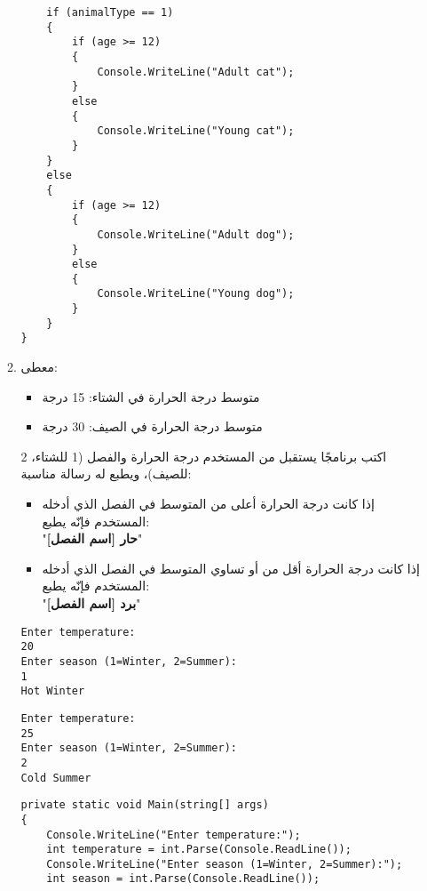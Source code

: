 \documentclass[12pt, twoside]{article}
\begin{document}
\begin{enumerate}[itemsep=3em]
\begin{enumerate}
\begin{boxSolution}
\begin{english}
\begin{verbatim}
    if (animalType == 1)
    {
        if (age >= 12)
        {
            Console.WriteLine("Adult cat");
        }
        else
        {
            Console.WriteLine("Young cat");
        }
    }
    else
    {
        if (age >= 12)
        {
            Console.WriteLine("Adult dog");
        }
        else
        {
            Console.WriteLine("Young dog");
        }
    }
}
\end{verbatim}
\end{english}
\end{boxSolution}
\fi
\clearpage
\fi

\item
معطى:
\begin{itemize}
\item متوسط درجة الحرارة في الشتاء: 15 درجة
\item متوسط درجة الحرارة في الصيف: 30 درجة
\end{itemize}%
اكتب برنامجًا يستقبل من المستخدم درجة الحرارة والفصل (1 للشتاء، 2 للصيف)، ويطبع له رسالة مناسبة:
\begin{itemize}
\item إذا كانت درجة الحرارة أعلى من المتوسط في الفصل الذي أدخله المستخدم فإنّه يطبع: \\ "\textbf{حار [اسم الفصل]}"
\item إذا كانت درجة الحرارة أقل من أو تساوي المتوسط في الفصل الذي أدخله المستخدم فإنّه يطبع: \\ "\textbf{برد [اسم الفصل]}"
\end{itemize}%
\ifdetailed
\begin{boxExample}[1]
\begin{english}
\begin{verbatim}
Enter temperature:
20
Enter season (1=Winter, 2=Summer):
1
Hot Winter
\end{verbatim}
\end{english}
\end{boxExample}
\begin{boxExample}[2]
\begin{english}
\begin{verbatim}
Enter temperature:
25
Enter season (1=Winter, 2=Summer):
2
Cold Summer
\end{verbatim}
\end{english}
\end{boxExample}

\ifwithsols
\begin{boxSolution}
\begin{english}
\begin{verbatim}
private static void Main(string[] args)
{
    Console.WriteLine("Enter temperature:");
    int temperature = int.Parse(Console.ReadLine());
    Console.WriteLine("Enter season (1=Winter, 2=Summer):");
    int season = int.Parse(Console.ReadLine());


\end{verbatim}
\end{english}
\end{boxSolution}
\end{enumerate}
\end{enumerate}
\end{document}

